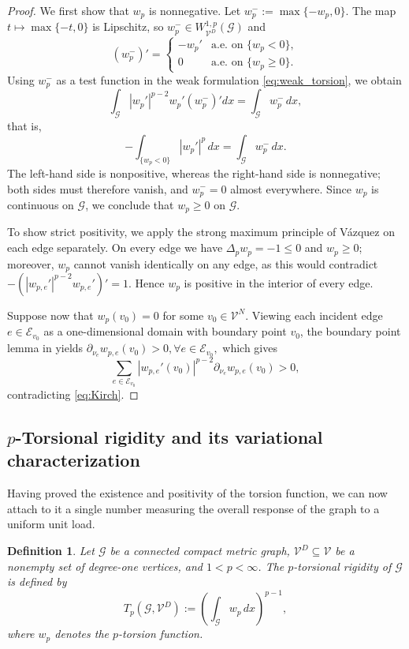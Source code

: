\documentclass[12pt,a4paper]{article}
\numberwithin{equation}{section}
\newtheorem{definition}[theorem]{Definition}
\newcommand{\WpD}{W^{1,p}_{\mathcal{V}^D}(\mathcal G)}
\begin{document}
\begin{proof}
	We first show that $w_p$ is nonnegative. Let
	\(
	w_p^-:=\max\{-w_p,0\}.
	\)
	The map $t\mapsto\max\{-t,0\}$ is Lipschitz, so
	$w_p^-\in\WpD$ and
	\[
	(w_p^-)'=
	\begin{cases}
		-w_p' & \text{a.e.\ on }\{w_p<0\},\\
		0 & \text{a.e.\ on }\{w_p\ge0\}.
	\end{cases}
	\]
	Using $w_p^-$ as a test function in the weak formulation
	\eqref{eq:weak_torsion}, we obtain
	\[
	\int_{\mathcal G}|w_p'|^{p-2}w_p'(w_p^-)'dx
	=
	\int_{\mathcal G}w_p^-\,dx,
	\]
	that is,
	\[
	-\int_{\{w_p<0\}}|w_p'|^p\,dx
	=
	\int_{\mathcal G}w_p^-\,dx.
	\]
	The left-hand side is nonpositive, whereas the right-hand side is
	nonnegative; both sides must therefore vanish, and
	$w_p^-=0$ almost everywhere. Since $w_p$ is continuous on
	$\mathcal G$, we conclude that
	\(
	w_p\ge0 \text{ on }\mathcal G.
	\)
	
	To show strict positivity, we apply the strong
	maximum principle of V\'azquez \cite[Theorem~5]{Vazquez} on each edge
	separately. On every edge we have
	$\Delta_p w_p=-1\le0$ and $w_p\ge0$; moreover, $w_p$ cannot vanish
	identically on any edge, as this would contradict
	$-(|w_{p,e}'|^{p-2}w_{p,e}')'=1$. Hence $w_p$ is positive in the
	interior of every edge.
	
	Suppose now that $w_p(v_0)=0$ for some $v_0\in \mathcal{V}^N$. Viewing
	each incident edge $e\in\mathcal E_{v_0}$ as a one-dimensional domain
	with boundary point $v_0$, the boundary point lemma in
	\cite[Theorem~5]{Vazquez} yields
	\(
	\partial_{\nu_e}w_{p,e}(v_0)>0,
\forall e\in \mathcal{E}_{v_0},
	\)
which gives
	\[
	\sum_{e\in \mathcal{E}_{v_0}}
	|w_{p,e}'(v_0)|^{p-2}
	\partial_{\nu_e}w_{p,e}(v_0)
	>0,
	\]
	contradicting \eqref{eq:Kirch}.
\end{proof}
\subsection{\texorpdfstring{$p$}{p}-Torsional rigidity and its variational characterization}
Having proved the existence and positivity of the torsion function,
we can now attach to it a single number measuring the overall response
of the graph to a uniform unit load.
\begin{definition}\label{def:Tp}
	Let $\mathcal G$ be a connected compact metric graph,
	$\mathcal{V}^D\subseteq \mathcal{V}$ be a nonempty set of degree-one vertices, and 
	$1<p<\infty$. 
	The \emph{$p$-torsional rigidity} of $\mathcal G$ is defined by
	\begin{equation}
		\label{eq:torsion_def}
		T_p(\mathcal G,\mathcal{V}^D)
		:=
		\left(
		\int_{\mathcal G}w_p\,dx
		\right)^{p-1},
	\end{equation}
	where $w_p$ denotes the $p$-torsion function.
\end{definition}
\end{document}
